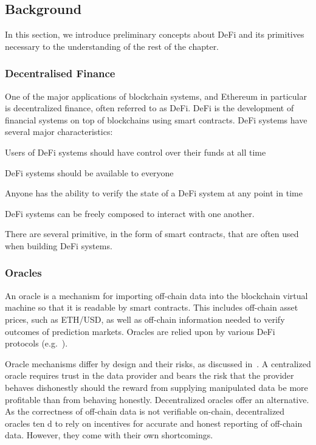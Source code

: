 \subsection{Background}
\label{sec:5b:background}
In this section, we introduce preliminary concepts about DeFi and its primitives necessary to the understanding of the rest of the chapter.

\subsubsection{Decentralised Finance}
One of the major applications of blockchain systems, and Ethereum in particular is decentralized finance, often referred to as DeFi.
DeFi is the development of financial systems on top of blockchains using smart contracts.
DeFi systems have several major characteristics:
\begin{description}
  \setlength{\baselineskip}{15pt}
\item[Non-custodial] Users of DeFi systems should have control over their funds at all time
\item[Permisionless] DeFi systems should be available to everyone
\item[Openly auditable] Anyone has the ability to verify the state of a DeFi system at any point in time
\item[Composable] DeFi systems can be freely composed to interact with one another.
\end{description}

There are several primitive, in the form of smart contracts, that are often used when building DeFi systems.

\subsubsection{Oracles}
\label{sec:oracles}
An oracle is a mechanism for importing off-chain data into the blockchain virtual machine 
so that it is readable by smart contracts. 
This includes off-chain asset prices, such as ETH/USD, as well as off-chain information needed to verify outcomes of prediction markets.
Oracles are relied upon by various DeFi protocols (e.g.~\cite{leshner2019compound,whitepaper:aave,whitepaper:maker,synthetix2020litepaper,peterson2015augur,leshner2019compound}).

Oracle mechanisms differ by design and their risks, as discussed in~\cite{Klages-Mundt2020,liu2020look}.
A centralized oracle requires trust in the data provider and bears the risk that the provider behaves dishonestly should the reward from supplying manipulated data be more profitable than from behaving honestly.
Decentralized oracles offer an alternative.
As the correctness of off-chain data is not verifiable on-chain, decentralized oracles ten
d to rely on incentives for accurate and honest reporting of off-chain data.
However, they come with their own shortcomings.


